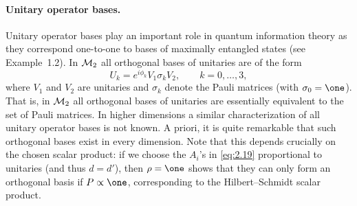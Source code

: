 \documentclass[11pt,a4paper]{article}
\numberwithin{equation}{section}
\theoremstyle{plain}
\theoremstyle{definition}
\begin{document}
\paragraph{Unitary operator bases.}
Unitary operator bases play an important role in quantum information theory as they
correspond one-to-one to bases of maximally entangled states (see Example~1.2). In
$\mathcal{M}_2$ all orthogonal bases of unitaries are of the form
\begin{equation}\label{eq:2.23}
    U_k = e^{i\phi_k} V_1 \sigma_k V_2, \qquad k=0,\dots,3,
\end{equation}
where $V_1$ and $V_2$ are unitaries and $\sigma_k$ denote the Pauli matrices (with
$\sigma_0=\one$). That is, in $\mathcal{M}_2$ all orthogonal bases of unitaries are
essentially equivalent to the set of Pauli matrices. In higher dimensions a similar
characterization of all unitary operator bases is not known. A priori, it is quite
remarkable that such orthogonal bases exist in every dimension. Note that this
depends crucially on the chosen scalar product: if we choose the $A_i$'s in
\eqref{eq:2.19} proportional to unitaries (and thus $d=d'$), then $\rho=\one$ shows
that they can only form an orthogonal basis if $P \propto \one$, corresponding to
the Hilbert--Schmidt scalar product.
\end{document}
